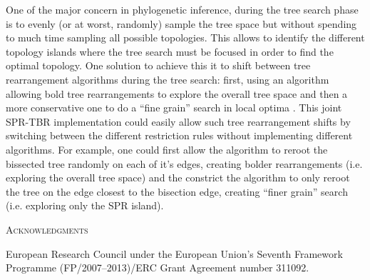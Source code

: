 \documentclass[12pt,letterpaper]{article}
\renewcommand{\section}[1]{%
\bigskip
\begin{center}
\begin{Large}
\normalfont\scshape #1
\medskip
\end{Large}
\end{center}}
\begin{document}
One of the major concern in phylogenetic inference, during the tree search phase is to evenly (or at worst, randomly) sample the tree space but without spending to much time sampling all possible topologies.
This allows to identify the different topology islands where the tree search must be focused in order to find the optimal topology.
One solution to achieve this it to shift between tree rearrangement algorithms during the tree search: first, using an algorithm allowing bold tree rearrangements to explore the overall tree space and then a more conservative one to do a ``fine grain'' search in local optima \citep{lakner2008efficiency}.
This joint SPR-TBR implementation could easily allow such tree rearrangement shifts by switching between the different restriction rules without implementing different algorithms.
For example, one could first allow the algorithm to reroot the bissected tree randomly on each of it's edges, creating bolder rearrangements (i.e. exploring the overall tree space) and the constrict the algorithm to only reroot the tree on the edge closest to the bisection edge, creating ``finer grain'' search (i.e. exploring only the SPR island).


\section{Acknowledgments}
European Research Council under the European Union’s Seventh Framework Programme (FP/2007–2013)/ERC Grant Agreement number 311092.




\end{document}
